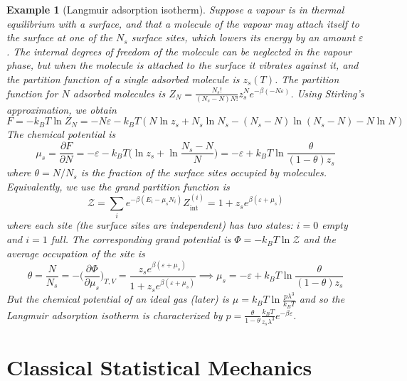 \documentclass[a4paper]{article}
\newtheorem{eg}{Example}[section]
\theoremstyle{new}
\begin{document}
\begin{eg}[Langmuir adsorption isotherm]
Suppose a vapour is in thermal equilibrium with a surface, and that a molecule of the vapour may attach itself to the surface at one of the $N_s$ surface sites, which lowers its energy by an amount $\varepsilon$. The internal degrees of freedom of the molecule can be neglected in the vapour phase, but when the molecule is attached to the surface it vibrates against it, and the partition function of a single adsorbed molecule is $z_s(T)$. The partition function for $N$ adsorbed molecules is $Z_N=\frac{N_s!}{(N_s-N)N!}z_s^Ne^{-\beta(-N\varepsilon)}$. Using Stirling's approximation, we obtain
$$F=-k_BT\ln Z_N=-N\varepsilon-k_BT(N\ln z_s+N_s\ln N_s-(N_s-N)\ln(N_s-N)-N\ln N)$$
The chemical potential is
$$\mu_s=\frac{\partial F}{\partial N}=-\varepsilon-k_BT\bigg(\ln z_s+\ln\frac{N_s-N}{N}\bigg)=-\varepsilon+k_BT\ln\frac{\theta}{(1-\theta)z_s}$$
where $\theta=N/N_s$ is the fraction of the surface sites occupied by molecules. Equivalently, we use the grand partition function is
$$\mathcal{Z}=\sum_ie^{-\beta(E_i-\mu_sN_i)}Z_{\text{int}}^{(i)}=1+z_se^{\beta(\varepsilon+\mu_s)}$$
where each site (the surface sites are independent) has two states: $i=0$ empty and $i=1$ full. The corresponding grand potential is $\Phi=-k_BT\ln\mathcal{Z}$ and the average occupation of the site is
$$\theta=\frac{N}{N_s}=-\bigg(\frac{\partial\Phi}{\partial\mu_s}\bigg)_{T,V}=\frac{z_se^{\beta(\varepsilon+\mu_s)}}{1+z_se^{\beta(\varepsilon+\mu_s)}}\implies\mu_s=-\varepsilon+k_BT\ln\frac{\theta}{(1-\theta)z_s}$$
But the chemical potential of an ideal gas (later) is $\mu=k_BT\ln\frac{p\lambda^3}{k_BT}$ and so the Langmuir adsorption isotherm is characterized by $p=\frac{\theta}{1-\theta}\frac{k_BT}{z_s\lambda^3}e^{-\beta\varepsilon}$.
\end{eg}
\newpage
\section{Classical Statistical Mechanics}
\end{document}
